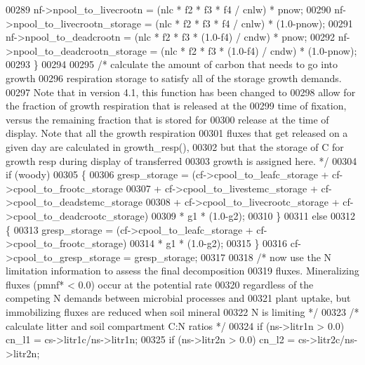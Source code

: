 \begin{DoxyCode}
00289         nf->npool\_to\_livecrootn         = (nlc * f2 * f3 * f4 / cnlw) * pnow;
00290         nf->npool\_to\_livecrootn\_storage = (nlc * f2 * f3 * f4 / cnlw) * (1.0-pnow);
00291         nf->npool\_to\_deadcrootn         = (nlc * f2 * f3 * (1.0-f4) / cndw) * pnow;
00292         nf->npool\_to\_deadcrootn\_storage = (nlc * f2 * f3 * (1.0-f4) / cndw) * (1.0-pnow);
00293     \}
00294     
00295     \textcolor{comment}{/* calculate the amount of carbon that needs to go into growth}
00296 \textcolor{comment}{    respiration storage to satisfy all of the storage growth demands. }
00297 \textcolor{comment}{    Note that in version 4.1, this function has been changed to }
00298 \textcolor{comment}{    allow for the fraction of growth respiration that is released at the}
00299 \textcolor{comment}{    time of fixation, versus the remaining fraction that is stored for}
00300 \textcolor{comment}{    release at the time of display. Note that all the growth respiration}
00301 \textcolor{comment}{    fluxes that get released on a given day are calculated in growth\_resp(),}
00302 \textcolor{comment}{    but that the storage of C for growth resp during display of transferred}
00303 \textcolor{comment}{    growth is assigned here. */}
00304     \textcolor{keywordflow}{if} (woody)
00305     \{
00306         gresp\_storage = (cf->cpool\_to\_leafc\_storage + cf->cpool\_to\_frootc\_storage
00307             + cf->cpool\_to\_livestemc\_storage + cf->cpool\_to\_deadstemc\_storage
00308             + cf->cpool\_to\_livecrootc\_storage + cf->cpool\_to\_deadcrootc\_storage)
00309             * g1 * (1.0-g2);
00310     \}
00311     \textcolor{keywordflow}{else}
00312     \{
00313         gresp\_storage = (cf->cpool\_to\_leafc\_storage + cf->cpool\_to\_frootc\_storage)
00314             * g1 * (1.0-g2);
00315     \}
00316     cf->cpool\_to\_gresp\_storage = gresp\_storage; 
00317 
00318     \textcolor{comment}{/* now use the N limitation information to assess the final decomposition}
00319 \textcolor{comment}{    fluxes. Mineralizing fluxes (pmnf* < 0.0) occur at the potential rate}
00320 \textcolor{comment}{    regardless of the competing N demands between microbial processes and}
00321 \textcolor{comment}{    plant uptake, but immobilizing fluxes are reduced when soil mineral}
00322 \textcolor{comment}{    N is limiting */}
00323     \textcolor{comment}{/* calculate litter and soil compartment C:N ratios */}
00324     \textcolor{keywordflow}{if} (ns->litr1n > 0.0) cn\_l1 = cs->litr1c/ns->litr1n;
00325     \textcolor{keywordflow}{if} (ns->litr2n > 0.0) cn\_l2 = cs->litr2c/ns->litr2n;

\end{DoxyCode}
